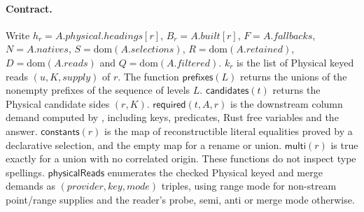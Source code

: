 \paragraph{Contract.}
Write $h_r=A.physical.headings[r]$, $B_r=A.built[r]$, $F=A.fallbacks$,
$N=A.natives$, $S=\mathrm{dom}(A.selections)$, $R=\mathrm{dom}(A.retained)$,
$D=\mathrm{dom}(A.reads)$ and $Q=\mathrm{dom}(A.filtered)$.
$k_r$ is the list of Physical keyed reads $(u,K,supply)$ of $r$.
The function $\mathsf{prefixes}(L)$ returns the unions of the nonempty
prefixes of the sequence of levels $L$.
$\mathsf{candidates}(t)$ returns the Physical candidate sides $(r,K)$.
$\mathsf{required}(t,A,r)$ is the downstream column demand computed by
, including keys, predicates, Rust free
variables and the answer. $\mathsf{constants}(r)$ is the map of reconstructible
literal equalities proved by a declarative selection, and the empty map for
a rename or union. $\mathsf{multi}(r)$ is true exactly for a union with no
correlated  origin. These functions do not inspect type spellings.
$\mathsf{physicalReads}$ enumerates the checked Physical keyed and merge
demands as $(provider,key,mode)$ triples, using range mode for non-stream
point/range supplies and the reader's probe, semi, anti or merge mode otherwise.
